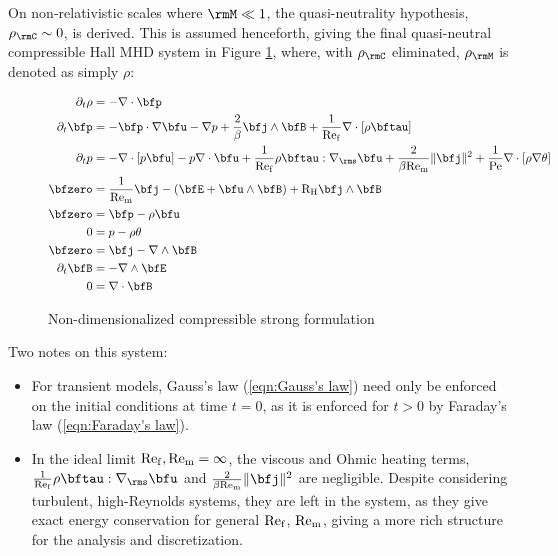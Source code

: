     On non-relativistic scales where $\rmM  \ll  1$, the quasi-neutrality hypothesis, $\rho_{\rmC}  \sim  0$, is derived. This is assumed henceforth, giving the final quasi-neutral compressible Hall MHD system in Figure \ref{fig:non-dim compressible strong form}, where, with $\rho_{\rmC}$ eliminated, $\rho_{\rmM}$ is denoted as simply $\rho$:

    \begin{figure}[!ht]
        \centering
        \line
        \begin{align}
            \partial_{t}\rho  &=  - \nabla\cdot\bfp  \label{eqn:mass conservation}  \\
            \partial_{t}\bfp  &=  - \bfp\cdot\nabla\bfu - \nabla p + \frac{2}{\beta}\bfj\wedge\bfB + \frac{1}{\rmRef}\nabla\cdot[\rho\bftau]  \label{eqn:momentum conservation}  \\
            \partial_{t}p     &=  - \nabla\cdot[p\bfu] - p\nabla\cdot\bfu + \frac{1}{\rmRef}\rho\bftau:\nabla_{\rms}\bfu + \frac{2}{\beta\rmRem}\|\bfj\|^{2} + \frac{1}{\rmPe}\nabla\cdot[\rho\nabla\theta]  \label{eqn:energy conservation}  \\
            \bfzero           &=  \frac{1}{\rmRem}\bfj - \left(\bfE + \bfu\wedge\bfB\right) + \rmRH\bfj\wedge\bfB  \label{eqn:current identity}  \\
            \bfzero           &=  \bfp - \rho\bfu  \label{eqn:velocity identity}  \\
            0                 &=  p - \rho\theta  \label{eqn:temperature identity}  \\
            \bfzero           &=  \bfj - \nabla\wedge\bfB  \label{eqn:Ampère's law}  \\
            \partial_{t}\bfB  &=  - \nabla\wedge\bfE  \label{eqn:Faraday's law}  \\
            0                 &=  \nabla\cdot\bfB  \label{eqn:Gauss's law}
        \end{align}
        \line
        \caption{Non-dimensionalized compressible strong formulation}
        \label{fig:non-dim compressible strong form}
    \end{figure}

    Two notes on this system:
    \begin{itemize}
        \item  For transient models, Gauss's law (\ref{eqn:Gauss's law}) need only be enforced on the initial conditions at time $t  =  0$, as it is enforced for $t  >  0$ by Faraday's law (\ref{eqn:Faraday's law}).

        \item  In the ideal limit $\mathrm{Re}_{\mathrm{f}}, \mathrm{Re}_{\mathrm{m}}  =  \infty$, the viscous and Ohmic heating terms, $\frac{1}{\rmRef}\rho\bftau:\nabla_{\rms}\bfu$ and $\frac{2}{\beta\rmRem}\|\bfj\|^{2}$ are negligible. Despite considering turbulent, high-Reynolds systems, they are left in the system, as they give exact energy conservation for general $\mathrm{Re}_{\mathrm{f}}$, $\mathrm{Re}_{\mathrm{m}}$, giving a more rich structure for the analysis and discretization. 
    \end{itemize}

